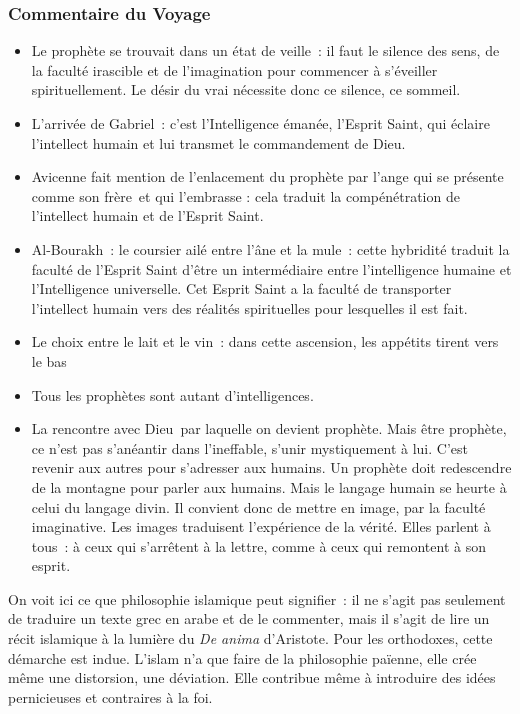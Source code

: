 \subsubsection{Commentaire du
Voyage}

\begin{itemize}
\item
  Le prophète se trouvait dans un état de veille~: il faut le silence
  des sens, de la faculté irascible et de l'imagination pour commencer à
  s'éveiller spirituellement. Le désir du vrai nécessite donc ce
  silence, ce sommeil.
\item
  L'arrivée de Gabriel~: c'est l'Intelligence émanée, l'Esprit Saint,
  qui éclaire l'intellect humain et lui transmet le commandement de
  Dieu.
\item
  Avicenne fait mention de l'enlacement du prophète par l'ange qui se
  présente comme son frère~et qui l'embrasse : cela traduit la
  compénétration de l'intellect humain et de l'Esprit Saint.
\item
  Al-Bourakh~: le coursier ailé entre l'âne et la mule~: cette hybridité
  traduit la faculté de l'Esprit Saint d'être un intermédiaire entre
  l'intelligence humaine et l'Intelligence universelle. Cet Esprit Saint
  a la faculté de transporter l'intellect humain vers des réalités
  spirituelles pour lesquelles il est fait.
\item
  Le choix entre le lait et le vin~: dans cette ascension, les appétits
  tirent vers le bas
\item
  Tous les prophètes sont autant d'intelligences.
\item
  La rencontre avec Dieu~par laquelle on devient prophète. Mais être
  prophète, ce n'est pas s'anéantir dans l'ineffable, s'unir
  mystiquement à lui. C'est revenir aux autres pour s'adresser aux
  humains. Un prophète doit redescendre de la montagne pour parler aux
  humains. Mais le langage humain se heurte à celui du langage divin. Il
  convient donc de mettre en image, par la faculté imaginative. Les
  images traduisent l'expérience de la vérité. Elles parlent à tous~: à
  ceux qui s'arrêtent à la lettre, comme à ceux qui remontent à son
  esprit.
\end{itemize}

On voit ici ce que philosophie islamique peut signifier~: il ne s'agit
pas seulement de traduire un texte grec en arabe et de le commenter,
mais il s'agit de lire un récit islamique à la lumière du \emph{De
anima} d'Aristote. Pour les orthodoxes, cette démarche est indue.
L'islam n'a que faire de la philosophie païenne, elle crée même une
distorsion, une déviation. Elle contribue même à introduire des idées
pernicieuses et contraires à la foi.

